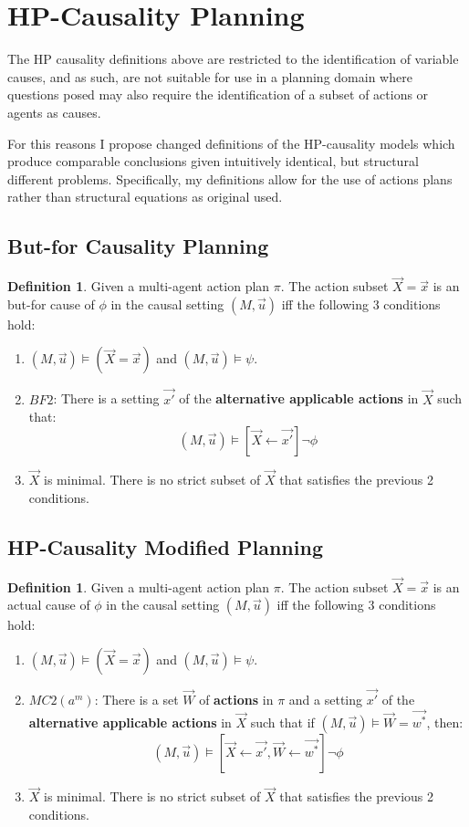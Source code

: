 \documentclass{article}
\theoremstyle{plain}
\theoremstyle{definition}
\newtheorem{defn}[thm]{Definition} %
\begin{document}
\section{HP-Causality Planning}
The HP causality definitions above are restricted to the identification of variable causes, and as such, are not suitable for use in a planning domain where questions posed may also require the identification of a subset of actions or agents as causes.

For this reasons I propose changed definitions of the HP-causality models which produce comparable conclusions given intuitively identical, but structural different problems. Specifically, my definitions allow for the use of actions plans rather than structural equations as original used.

\subsection{But-for Causality Planning}

\begin{defn} Given a multi-agent action plan $\pi$. The action subset $\vec{X}=\vec{x}$ is an but-for cause of $\phi$ in the causal setting $(M,\vec{u})$ iff the following 3 conditions hold:
\begin{enumerate}
\item $(M,\vec{u}) \models (\vec{X}=\vec{x})$ and $(M,\vec{u}) \models \psi$.
\item $BF2$: There is a setting $\vec{x'}$ of the \textbf{alternative applicable actions} in $\vec{X}$ such that:
\[
(M,\vec{u}) \models [\vec{X} \leftarrow \vec{x'}] \neg \phi
\]
\item $\vec{X}$ is minimal. There is no strict subset of $\vec{X}$ that satisfies the previous 2 conditions.
\end{enumerate}

\end{defn}


\subsection{HP-Causality Modified Planning}
\begin{defn} Given a multi-agent action plan $\pi$. The action subset $\vec{X}=\vec{x}$ is an actual cause of $\phi$ in the causal setting $(M,\vec{u})$ iff the following 3 conditions hold:
\begin{enumerate}
\item $(M,\vec{u}) \models (\vec{X}=\vec{x})$ and $(M,\vec{u}) \models \psi$.
\item $MC2(a^m)$: There is a set $\vec{W}$ of \textbf{actions} in $\pi$ and a setting $\vec{x'}$ of the \textbf{alternative applicable actions} in $\vec{X}$ such that if $(M,\vec{u}) \models \vec{W} = \vec{w^*}$, then:
\[
(M,\vec{u}) \models [\vec{X} \leftarrow \vec{x'}, \vec{W} \leftarrow \vec{w^*}] \neg \phi
\]
\item $\vec{X}$ is minimal. There is no strict subset of $\vec{X}$ that satisfies the previous 2 conditions.
\end{enumerate}

\end{defn}
\end{document}
